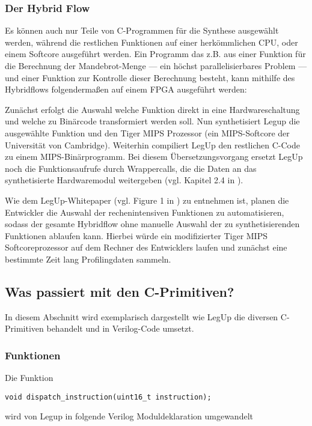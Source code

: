 \documentclass[oneside,a4paper]{article}
\begin{document}
\subsubsection{Der Hybrid Flow}
Es können auch nur Teile von C-Programmen für die Synthese ausgewählt
werden, während die restlichen Funktionen auf einer herkömmlichen CPU, oder einem
Softcore ausgeführt werden. Ein Programm das z.B. aus einer Funktion
für die Berechnung der Mandebrot-Menge --- ein höchst parallelisierbares
Problem --- und einer Funktion zur Kontrolle dieser Berechnung besteht,
kann mithilfe des Hybridflows folgendermaßen auf einem FPGA ausgeführt werden:

Zunächst erfolgt die Auswahl welche Funktion direkt in eine Hardwareschaltung
und welche zu Binärcode transformiert werden soll. Nun synthetisiert Legup
die ausgewählte Funktion und den Tiger MIPS Prozessor (ein MIPS-Softcore der
Universität von Cambridge). Weiterhin compiliert LegUp den restlichen C-Code
zu einem MIPS-Binärprogramm. Bei diesem Übersetzungsvorgang ersetzt LegUp
noch die Funktionsaufrufe durch Wrappercalls, die die Daten an das synthetisierte
Hardwaremodul weitergeben (vgl. Kapitel 2.4 in \cite{LEGUP}).

Wie dem LegUp-Whitepaper (vgl. Figure 1 in \cite{LEGUPPAPER})
zu entnehmen ist, planen die Entwickler
die Auswahl der rechenintensiven Funktionen zu automatisieren, sodass der
gesamte Hybridflow ohne manuelle Auswahl der zu synthetisierenden Funktionen
ablaufen kann. Hierbei würde ein modifizierter Tiger MIPS Softcoreprozessor auf dem
Rechner des Entwicklers laufen und zunächst eine bestimmte Zeit lang Profilingdaten
sammeln.

\subsection{Was passiert mit den C-Primitiven?}
In diesem Abschnitt wird exemplarisch dargestellt wie
LegUp die diversen C-Primitiven behandelt und in Verilog-Code
umsetzt.

\subsubsection{Funktionen}

Die Funktion
\begin{lstlisting}[style=c]
void dispatch_instruction(uint16_t instruction);
\end{lstlisting}

wird von Legup in folgende Verilog Moduldeklaration umgewandelt
\end{document}
